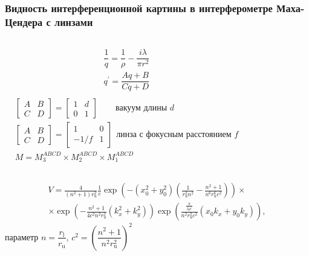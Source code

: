 \begin{frame}
\frametitle{Видность интерференционной картины в интерферометре Маха-Цендера с линзами}
\begin{columns}
\begin{align*}
& \dfrac{1}{q} = \dfrac{1}{\rho} - \dfrac{i \lambda}{\pi r^2} \\
& q^{\prime}=\dfrac{A q+B}{C q+D}\\
\end{align*}
\begin{align*}
& \begin{bmatrix} A & B \\ C & D \end{bmatrix}=\begin{bmatrix} 1 & d \\ 0 & 1 \end{bmatrix} \hspace{25pt}\text{вакуум длины $d$}\\
& \begin{bmatrix} A & B \\ C & D \end{bmatrix}=\begin{bmatrix} 1 & 0 \\ -1/f & 1 \end{bmatrix} \hspace{5pt}\text{линза с фокусным расстоянием $f$} \\
& M = M_3^{ABCD} \times M_2^{ABCD} \times M_1^{ABCD}
\end{align*}
\end{columns}

\begin{equation*}
\begin{split}
    V =\frac{4}{\left(n^{2}+1\right) r_{\mathrm{u}}^{2}} \frac{1}{c} \exp \left(-\left(x_{0}^{2}+y_{0}^{2}\right)\left(\frac{1}{r_{\mathrm{u}}^{2} n^{2}}-\frac{n^{2}+1}{n^{6} r_{\mathrm{u}}^{6} c^{2}}\right)\right) \times \\ \times \exp \left(-\frac{n^{2}+1}{4 c^{2} n^{2} r_{\mathrm{u}}^{2}}\left(k_{x}^{2}+k_{y}^{2}\right)\right) \exp \left(\frac{\frac{\pi}{\lambda \rho^{\prime}}}{n^{2} r_{\mathrm{u}}^{2} c^{2}}\left(x_{0} k_{x}+y_{0} k_{y}\right)\right),
\end{split}
\end{equation*}
параметр $n=\dfrac{r_{\mathrm{l}}}{r_{\mathrm{u}}}$, $c^2 = (\dfrac{n^2 + 1}{n^2r^2_{\mathrm{u}}})^2$
\end{frame}

